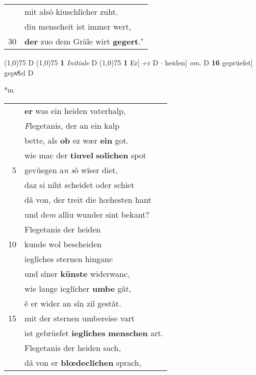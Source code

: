 \documentclass[8pt,a4paper,notitlepage]{article}
\begin{document}
\begin{table}[ht]
\begin{minipage}[t]{0.5\linewidth}
\begin{tabular}{rl}
 & mit alsô kiuschlîcher zuht.\\ 
 & diu menscheit ist immer wert,\\ 
30 & \textbf{der} zuo dem Grâle wirt \textbf{gegert}."\\ 
\end{tabular}
\scriptsize
\line(1,0){75} \newline
D \newline
\line(1,0){75} \newline
\textbf{1} \textit{Initiale} D  \newline
\line(1,0){75} \newline
\textbf{1} Er] ÷r D  $\cdot$ heiden] \textit{om.} D \textbf{16} geprüefet] gepvͤfel D \newline
\end{minipage}
\hspace{0.5cm}
\begin{minipage}[t]{0.5\linewidth}
\small
\begin{center}*m
\end{center}
\begin{tabular}{rl}
 & \textbf{er} was ein heiden vaterhalp,\\ 
 & \textit{F}legetanis, der an ein kalp\\ 
 & bette, als \textbf{ob} ez wær \textbf{ein} got.\\ 
 & wie mac der \textbf{tiuvel} \textbf{solichen} spot\\ 
5 & gevüegen a\textit{n} \textit{s}ô wîser diet,\\ 
 & daz si niht scheidet oder schiet\\ 
 & dâ von, der treit die hœhesten hant\\ 
 & und de\textit{m} alliu wunder sint bekant?\\ 
 & Flegetanis der heiden\\ 
10 & kunde wol bescheiden\\ 
 & ieglîches sternen hinganc\\ 
 & und sîner \textbf{künste} widerwanc,\\ 
 & wie lange ieglîcher \textbf{umbe} gât,\\ 
 & ê er wider an sîn zil gestât.\\ 
15 & mit der sternen umbereise vart\\ 
 & ist gebrüefet \textbf{ieglîches} \textbf{menschen} art.\\ 
 & Flegetanis der heiden sach,\\ 
 & dâ von er \textbf{blœdeclîchen} sprach,\\ 

\end{tabular}
\end{minipage}
\end{table}
\end{document}

